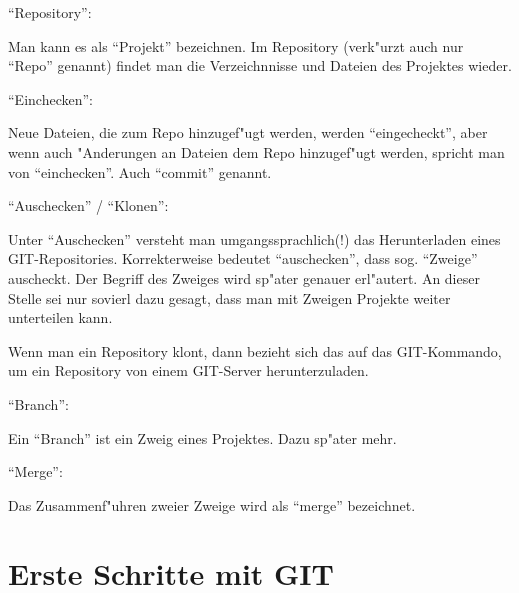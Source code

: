 \documentclass[german,a4paper]{report}
\begin{document}
``Repository'':

Man kann es als ``Projekt'' bezeichnen. Im Repository (verk"urzt auch nur ``Repo'' genannt)
findet man die Verzeichnnisse und Dateien des Projektes wieder.

``Einchecken'':

Neue Dateien, die zum Repo hinzugef"ugt werden, werden ``eingecheckt'', aber wenn auch
"Anderungen an Dateien dem Repo hinzugef"ugt werden, spricht man von ``einchecken''. Auch
``commit'' genannt.

``Auschecken'' / ``Klonen'':

Unter ``Auschecken'' versteht man umgangssprachlich(!) das Herunterladen eines GIT-Repositories.
Korrekterweise bedeutet ``auschecken'', dass sog. ``Zweige'' auscheckt. Der Begriff des Zweiges
wird sp"ater genauer erl"autert. An dieser Stelle sei nur sovierl dazu gesagt, dass man mit Zweigen
Projekte weiter unterteilen kann.

Wenn man ein Repository klont, dann bezieht sich das auf das GIT-Kommando, um ein Repository
von einem GIT-Server herunterzuladen.

``Branch'':

Ein ``Branch'' ist ein Zweig eines Projektes. Dazu sp"ater mehr.

``Merge'':

Das Zusammenf"uhren zweier Zweige wird als ``merge'' bezeichnet.

\chapter{Erste Schritte mit GIT}
\end{document}
